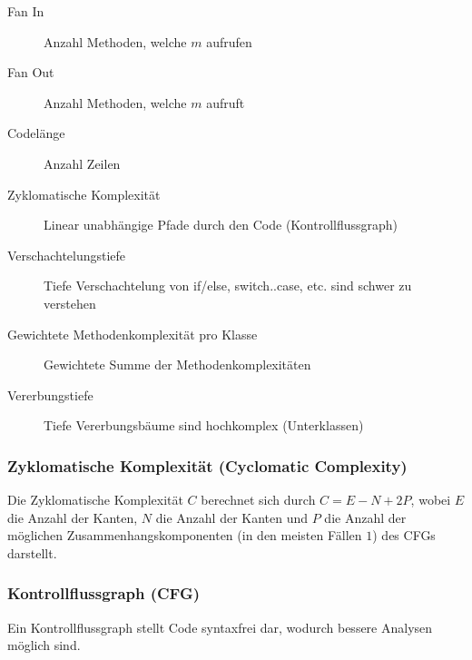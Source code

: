 \documentclass[ngerman,color=3b]{tuda_summary}
\begin{document}
\begin{description}
    \item[Fan In] Anzahl Methoden, welche $ m $ aufrufen
    \item[Fan Out] Anzahl Methoden, welche $ m $ aufruft
    \item[Codelänge] Anzahl Zeilen
    \item[Zyklomatische Komplexität] Linear unabhängige Pfade durch den Code (Kontrollflussgraph)
    \item[Verschachtelungstiefe] Tiefe Verschachtelung von if/else, switch..case, etc. sind schwer zu verstehen
    \item[Gewichtete Methodenkomplexität pro Klasse] Gewichtete Summe der Methodenkomplexitäten
    \item[Vererbungstiefe] Tiefe Vererbungsbäume sind hochkomplex (Unterklassen)
\end{description}

\subsubsection{Zyklomatische Komplexität (Cyclomatic Complexity)}
Die Zyklomatische Komplexität $ C $ berechnet sich durch $ C = E - N + 2P $, wobei $ E $ die Anzahl der Kanten, $ N $ die Anzahl der Kanten und $ P $ die Anzahl der möglichen Zusammenhangskomponenten (in den meisten Fällen $ 1 $) des CFGs darstellt.

\subsubsection{Kontrollflussgraph (CFG)}
\label{diagram:cfg}

Ein Kontrollflussgraph stellt Code syntaxfrei dar, wodurch bessere Analysen möglich sind.
\end{document}
